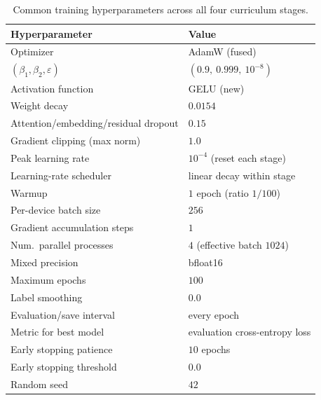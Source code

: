 \documentclass[titlepage,a4paper,11pt]{report}
\begin{document}
    \begin{table}[h!]
    \centering
    \caption{Common training hyperparameters across all four curriculum stages.}
    \label{tab:curriculum_hyperparams}
    \begin{tabular}{ll}
        \toprule
        \textbf{Hyperparameter} & \textbf{Value} \\
        \midrule
        Optimizer & AdamW (fused) \\
        \quad $(\beta_1, \beta_2, \varepsilon)$ & $(0.9,\ 0.999,\ 10^{-8})$ \\
        Activation function & GELU (new) \\
        Weight decay & $0.0154$ \\
        Attention/embedding/residual dropout & $0.15$ \\
        Gradient clipping (max norm) & $1.0$ \\
        Peak learning rate & $10^{-4}$ (reset each stage) \\
        Learning-rate scheduler & linear decay within stage \\
        Warmup & $1$ epoch (ratio $1/100$) \\
        Per-device batch size & $256$ \\
        Gradient accumulation steps & $1$ \\
        Num.\ parallel processes & $4$ (effective batch $1024$) \\
        Mixed precision & bfloat16 \\
        Maximum epochs & $100$ \\
        Label smoothing & $0.0$ \\
        Evaluation/save interval & every epoch \\
        Metric for best model & evaluation cross-entropy loss \\
        Early stopping patience & $10$ epochs \\
        Early stopping threshold & $0.0$ \\
        Random seed & $42$ \\
        \bottomrule
    \end{tabular}
    \end{table}
\end{document}
